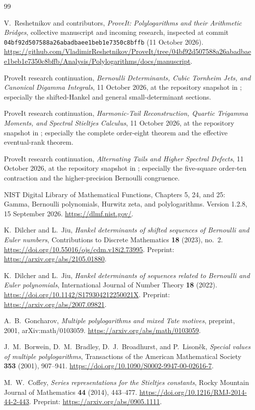 \documentclass[11pt]{article}
\theoremstyle{definition}
\begin{document}
 \begin{thebibliography}{99}

V.~Reshetnikov and contributors,
\emph{ProveIt: Polylogarithms and their Arithmetic Bridges},
collective manuscript and incoming research, inspected at commit
\texttt{04bf92d507588a26abadbaee1beb1e7350c8bffb} (11 October 2026).
\url{https://github.com/VladimirReshetnikov/ProveIt/tree/04bf92d507588a26abadbaee1beb1e7350c8bffb/Analysis/Polylogarithms/docs/manuscript}.

ProveIt research continuation,
\emph{Bernoulli Determinants, Cubic Tornheim Jets, and Canonical Digamma Integrals},
11 October 2026, at the repository snapshot in \cite{Repo}; especially
the shifted-Hankel and general small-determinant sections.

ProveIt research continuation,
\emph{Harmonic-Tail Reconstruction, Quartic Trigamma Moments, and
Spectral Stieltjes Calculus}, 11 October 2026, at the repository snapshot
in \cite{Repo}; especially the complete order-eight theorem and the
effective eventual-rank theorem.

ProveIt research continuation,
\emph{Alternating Tails and Higher Spectral Defects}, 11 October 2026,
at the repository snapshot in \cite{Repo}; especially the five-square
order-ten contraction and the higher-precision Bernoulli congruence.

NIST Digital Library of Mathematical Functions,
Chapters 5, 24, and 25: Gamma, Bernoulli polynomials, Hurwitz zeta, and
polylogarithms.  Version 1.2.8, 15 September 2026.
\url{https://dlmf.nist.gov/}.

K.~Dilcher and L.~Jiu,
\emph{Hankel determinants of shifted sequences of Bernoulli and Euler numbers},
Contributions to Discrete Mathematics \textbf{18} (2023), no.~2.
\url{https://doi.org/10.55016/ojs/cdm.v18i2.73995}.
Preprint: \url{https://arxiv.org/abs/2105.01880}.

K.~Dilcher and L.~Jiu,
\emph{Hankel determinants of sequences related to Bernoulli and Euler polynomials},
International Journal of Number Theory \textbf{18} (2022).
\url{https://doi.org/10.1142/S179304212250021X}.
Preprint: \url{https://arxiv.org/abs/2007.09821}.

A.~B.~Goncharov,
\emph{Multiple polylogarithms and mixed Tate motives},
preprint, 2001, arXiv:math/0103059.
\url{https://arxiv.org/abs/math/0103059}.

J.~M.~Borwein, D.~M.~Bradley, D.~J.~Broadhurst, and P.~Lison\v{e}k,
\emph{Special values of multiple polylogarithms},
Transactions of the American Mathematical Society \textbf{353} (2001),
907--941.
\url{https://doi.org/10.1090/S0002-9947-00-02616-7}.

M.~W.~Coffey,
\emph{Series representations for the Stieltjes constants},
Rocky Mountain Journal of Mathematics \textbf{44} (2014), 443--477.
\url{https://doi.org/10.1216/RMJ-2014-44-2-443}.
Preprint: \url{https://arxiv.org/abs/0905.1111}.

\end{thebibliography}
 
\end{document}

